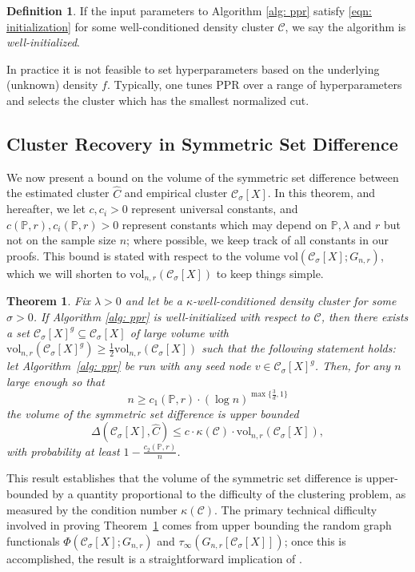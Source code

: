 \documentclass{article}
\newcommand{\vol}{\mathrm{vol}}
\newcommand{\1}{\mathbf{1}}
\newcommand{\Cset}{\mathcal{C}}
\newcommand{\Csig}{\Cset_{\sigma}}
\newcommand{\Pbb}{\mathbb{P}}
\newcommand{\Cbb}{\mathbb{C}}
\theoremstyle{alden}
\theoremstyle{aldenthm}
\newtheorem{theorem}{Theorem}
\theoremstyle{definition}
\newtheorem{definition}{Definition}[section]
\theoremstyle{remark}
\begin{document}
\begin{definition}
	If the input parameters to Algorithm \ref{alg: ppr} satisfy \eqref{eqn:
		initialization} for some well-conditioned density cluster $\Cset$, we
	say the algorithm is \emph{well-initialized}. 
\end{definition}
\noindent In practice it is  not feasible to set hyperparameters based on the
underlying (unknown) density $f$. Typically, one tunes PPR over a range of
hyperparameters and selects the cluster which has the smallest normalized cut. 

\subsection{Cluster Recovery in Symmetric Set Difference}
We now present a bound on the volume of the symmetric set difference between the estimated cluster $\widehat{C}$ and empirical cluster $\Csig[X]$. 
In this theorem, and hereafter, we let 
$c, c_i > 0$ represent universal constants, and 
$c(\Pbb,r), c_i(\Pbb,r) > 0$ represent constants which may depend on $\Pbb,\lambda$ and $r$ but not on the sample size $n$; where possible, we keep track of all constants in our proofs. This bound is stated with respect to the volume $\vol(\Csig[X];G_{n,r})$, which we will shorten to $\vol_{n,r}(\Csig[X])$ to keep things simple.
\begin{theorem}
	\label{thm:volume_ssd}
	Fix $\lambda > 0$ and let \smash{$\Cset \in \Cbb_f(\lambda)$} be a
	$\kappa$-well-conditioned density cluster for some $\sigma > 0$. If Algorithm \ref{alg: ppr} is \emph{well-initialized} with respect to $\Cset$, then 
	there exists a set $\Csig[X]^g \subseteq \Csig[X]$ of large volume 
	with $\vol_{n,r}(\Csig[X]^g) \geq \frac{1}{2}\vol_{n,r}(\Csig[X])$ such that the following statement holds: let Algorithm~\ref{alg: ppr} be run with any seed node $v \in \Csig[X]^g$. Then, for any $n$ large enough so that
	\begin{equation*}
	n \geq c_1(\Pbb,r)\cdot (\log n)^{\max\{\frac{3}{d},1\}}
	\end{equation*}
	the volume of the symmetric set difference is upper bounded
	\begin{equation}
	\label{eqn:volume_ssd}
	\Delta(\Csig[X], \widehat{C}) \leq c \cdot \kappa(\Cset) \cdot \vol_{n,r}(\Csig[X]),
	\end{equation}
	with probability at least $1 - \frac{c_2(\Pbb,r)}{n}$. 
\end{theorem}
This result establishes that the volume of the symmetric set difference \smash{$\Delta(\Csig[X],
	\widehat{C})$} is upper-bounded by a quantity proportional to the difficulty of the clustering problem, as
measured by the condition number $\kappa(\Cset)$. The primary technical difficulty involved in proving Theorem~\ref{thm:volume_ssd} comes from upper bounding the random graph functionals $\Phi(\Csig[X];G_{n,r})$ and $\tau_{\infty}(G_{n,r}[\Csig[X]])$; once this is accomplished, the result is a straightforward implication of \citet{zhu2013}.
\end{document}
